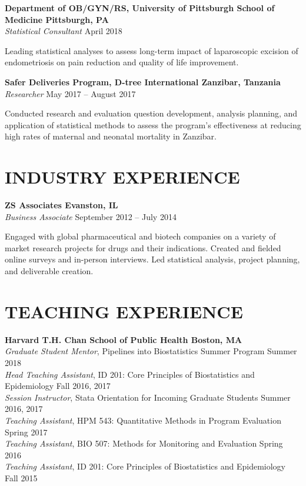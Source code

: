 \documentclass[12pt]{article}
\begin{document}
\textbf{Department of OB/GYN/RS, University of Pittsburgh School of Medicine \hfill \hfill Pittsburgh, PA}  \\
\textit{ Statistical Consultant} \hfill \hfill April 2018
\begin{addmargin}[1em]{2em} Leading statistical analyses to assess long-term impact of laparoscopic excision of endometriosis on pain reduction and quality of life improvement. \\ \end{addmargin} 

\textbf{Safer Deliveries Program, D-tree International \hfill \hfill Zanzibar, Tanzania} \\
\textit{Researcher} \hfill \hfill May 2017 -- August 2017 
\begin{addmargin}[1em]{2em} Conducted research and evaluation question development, analysis planning, and application of statistical methods to assess the program's effectiveness at reducing high rates of maternal and neonatal mortality in Zanzibar. \end{addmargin}

\section*{\textbf{{\large I}{NDUSTRY} {\large E}{XPERIENCE}}}
\textbf{ZS Associates \hfill \hfill Evanston, IL} \\
\textit{Business Associate} \hfill \hfill September 2012 -- July 2014
\begin{addmargin}[1em]{2em} 
	Engaged with global pharmaceutical and biotech companies on a variety of market research projects for drugs and their indications. Created and fielded online surveys and in-person interviews. Led statistical analysis, project planning, and deliverable creation.
\end{addmargin}

\section*{\textbf{{\large T}{EACHING} {\large E}{XPERIENCE}}}
\textbf{Harvard T.H. Chan School of Public Health \hfill \hfill Boston, MA} \\
\textit{Graduate Student Mentor}, Pipelines into Biostatistics Summer Program \hfill \hfill Summer 2018 \\
\textit{Head Teaching Assistant}, ID 201: Core Principles of Biostatistics and Epidemiology \hfill \hfill Fall 2016, 2017 \\
\textit{Session Instructor}, Stata Orientation for Incoming Graduate Students \hfill \hfill	Summer 2016, 2017 \\
\textit{Teaching Assistant}, HPM 543: Quantitative Methods in Program Evaluation \hfill \hfill Spring 2017 \\
\textit{Teaching Assistant}, BIO 507: Methods for Monitoring and Evaluation \hfill \hfill Spring 2016 \\
\textit{Teaching Assistant}, ID 201: Core Principles of Biostatistics and Epidemiology \hfill \hfill Fall 2015 \\
\end{document}
